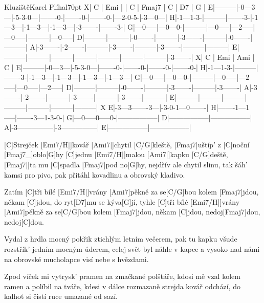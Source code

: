 \begin{song}{Kluziště}{Karel Plíhal}{70pt}
\tabs{0pt}
X| C       | Emi     |         | C       | Fmaj7   | C       | D7      | G       |
E|---------|-0---3---|-5-3-0---|-------0-|-------0-|-------0-|---2-0-5-|-3---0---|
H|-1---1-3-|---------|-------3-|-1---3---|-1---3---|-1---3---|-3-------|-------3-|
G|---0-----|---0---0-|---------|---0-----|---2-----|---0-----|---------|---0-----|
D|---------|---------|-0-------|---------|-3-------|---------|-0-------|---------|
A|-3-------|-2-------|---------|-3-------|---------|-3-------|---------|---------|
E|---------|---------|---------|---------|---------|---------|---------|-3-------|
\endtabs
\tabs{0pt}
X| C       | Emi     | Ami     |  C      |
E|---------|-0---3---|-5-3-0---|-------0-|-------0-|-------0-|-------0-|
H|-1---1-3-|---------|-------3-|-1---3---|-1---3---|-1---3---|-1---3---|
G|---0-----|---0---0-|---------|---0-----|---2-----|---0-----|---2-----|
D|---------|---------|-0-------|---------|-3-------|---------|-3-------|
A|-3-------|-2-------|---------|-3-------|---------|-3-------|---------|
E|---------|---------|---------|---------|---------|---------|---------|
\endtabs
\tabs{0pt}
X
E|-3---3-------3---|-3-0-1---0-------|
H|-------1---1-----|-------3---1-3-0-|
G|---0-----0-----0-|-----------------|
D|-----------------|-----------------|
A|-3---------------|-3---------------|
E|-----------------|-----------------|
\endtabs

%
[C]Strejček [Emi7/H|]{kovář} [Ami7|]{chytil} [C/G]kleště, [Fmaj7]{uštíp'} z [C]noční [Fmaj7_]{oblo}[G]hy
[C]jednu [Emi7/H|]{malou} [Ami7|]{kapku} [C/G]deště, [Fmaj7|]{ta mu} [C]spadla [Fmaj7]pod no[G]hy,
nejdřív ale chytil slinu, tak šáh' kamsi pro pivo,
pak přitáhl kovadlinu a obrovský kladivo.

\chorus%
Zatím [C]tři bílé [Emi7/H|]{vrány} [Ami7]pěkně za se[C/G]bou
kolem [Fmaj7]jdou, někam [C]jdou, do ryt[D7]mu se kýva[G]jí,
tyhle [C]tři bílé [Emi7/H|]{vrány} [Ami7]pěkně za se[C/G]bou
kolem [Fmaj7]jdou, někam [C]jdou, nedoj[Fmaj7]dou, nedoj[C]dou.

%
Vydal z hrdla mocný pokřik ztichlým letním večerem,
pak tu kapku všude rozstřík' jedním mocným úderem,
celej svět byl náhle v kapce a vysoko nad námi
na obrovské mucholapce visí nebe s hvězdami.
\repchor

%
Zpod víček mi vytrysk' pramen na zmačkané polštáře,
kdosi mě vzal kolem ramen a políbil na tváře,
kdesi v dálce rozmazaně strejda kovář odchází,
do kalhot si čistí ruce umazané od sazí.
\end{song}
\vfil
\hfil{}
